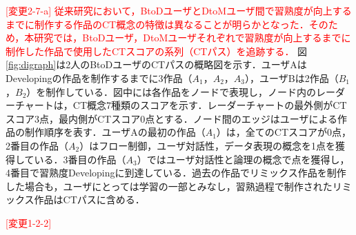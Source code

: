 \documentclass[submit]{ipsj}
\newcommand{\todo}[1]{\colorbox{yellow}{{\bf TODO}:}{\color{red} {\textbf{[#1]}}}}
\begin{document}
\textcolor{red}{[変更2-7-a]
従来研究\cite{Ando_2021}において，BtoDユーザとDtoMユーザ間で習熟度が向上するまでに制作する作品のCT概念の特徴は異なることが明らかとなった．そのため，本研究では，BtoDユーザ，DtoMユーザそれぞれで習熟度が向上するまでに制作した作品で使用したCTスコアの系列（CTパス）を追跡する．
}
図\ref{fig:digraph}は2人のBtoDユーザのCTパスの概略図を示す．ユーザAはDevelopingの作品を制作するまでに3作品（$A_1$，$A_2$，$A_3$），ユーザBは2作品（$B_1$，$B_2$）を制作している．図中には各作品をノードで表現し，ノード内のレーダーチャートは，CT概念7種類のスコアを示す．レーダーチャートの最外側がCTスコア3点，最内側がCTスコア0点とする．ノード間のエッジはユーザによる作品の制作順序を表す．ユーザAの最初の作品（$A_1$）は，全てのCTスコアが0点，2番目の作品（$A_2$）はフロー制御，ユーザ対話性，データ表現の概念を1点を獲得している．3番目の作品（$A_3$）ではユーザ対話性と論理の概念で\textcolor{red}{}点を獲得し，4番目で習熟度Developingに到達している．過去の作品でリミックス作品を制作した場合も，ユーザにとっては学習の一部とみなし，習熟過程で制作されたリミックス作品はCTパスに含める．


\textcolor{red}{[変更1-2-2]}
\end{document}
